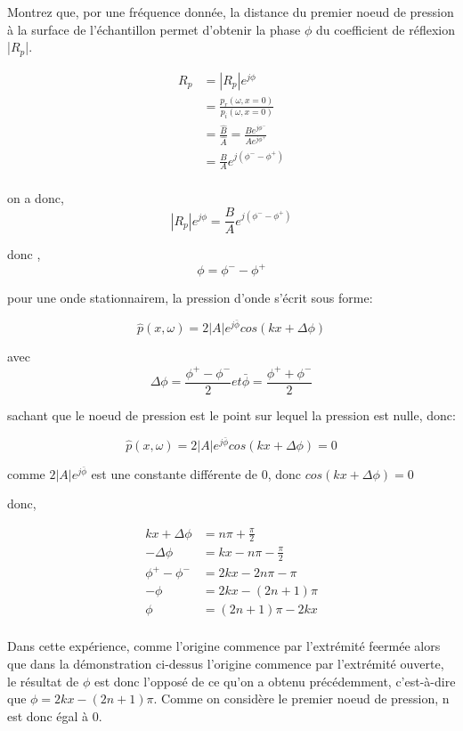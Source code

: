 \documentclass[a4paper,11pt]{article}
\begin{document}
Montrez que, por une fréquence donnée, la distance du premier noeud de pression à la surface de l'échantillon permet d'obtenir la phase $\phi$ du coefficient de réflexion |$R_{p}$|.

\begin{align*}
  R_{p} &= |R_{p}|{e^{j \phi}}\\
        &= \frac{p_{r}(\omega, x=0)}{p_{i}(\omega, x=0)}\\
        &= \frac{\widehat{B}}{\widehat{A}}=\frac{Be^{j {\phi}^{-}}}{Ae^{j {\phi}^{+}}}\\
        &= \frac{B}{A} e^{j ({\phi}^{-}-{\phi}^{+})}\\
\end{align*}        

on a donc, $$|R_{p}|{e^{j \phi}}=\frac{B}{A} e^{j ({\phi}^{-}-{\phi}^{+})}$$  
   
donc ,  $$\boxed{\phi = {\phi}^{-}-{\phi}^{+}}$$

pour une onde stationnairem, la pression d'onde s'écrit sous forme:

$$\widehat{p}(x,\omega) = 2|A|e^{j {\bar{\phi}}} cos(kx + \Delta \phi) $$

avec $$\Delta \phi = \frac{{\phi}^{+}-{\phi}^{-}}{2} et \bar{\phi} = \frac{{\phi}^{+}+{\phi}^{-}}{2}$$

sachant que le noeud de pression est le point sur lequel la pression est nulle, donc:


$$\widehat{p}(x,\omega) = 2|A|e^{j {\bar{\phi}}} cos(kx + \Delta \phi)=0$$

comme $2|A|e^{j {\bar{\phi}}}$ est une constante différente de 0, donc $cos(kx + \Delta \phi)=0$

donc, 

\begin{align*}
kx + \Delta \phi &= n \pi + \frac{\pi}{2} \\
   - \Delta \phi &= kx-n \pi-\frac{\pi}{2} \\
   {\phi}^{+}-{\phi}^{-} &= 2kx-2n \pi- \pi \\
   -\phi &= 2kx-(2n+1) \pi \\
   \phi &= (2n+1) \pi-2kx \\
\end{align*}

Dans cette expérience, comme l'origine commence par l'extrémité feermée alors que dans la démonstration ci-dessus l'origine commence par l'extrémité ouverte, le résultat de $\phi$ est donc l'opposé de ce qu'on a obtenu précédemment, c'est-à-dire que 
$\phi = 2kx-(2n+1) \pi $. Comme on considère le premier noeud de pression, n est donc égal à 0. 
\end{document}
